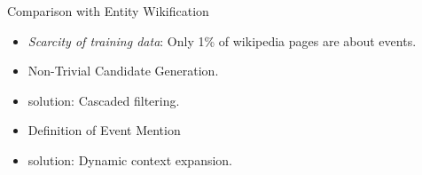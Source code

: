 \begin{frame}{Comparison with Entity Wikification}

  \begin{itemize}[<+->]
  \item \emph{Scarcity of training data}: Only 1\% of wikipedia pages are about events.
  \item Non-Trivial Candidate Generation.
  \item {\color{red}solution:} Cascaded filtering.
  \item Definition of Event Mention
  \item {\color{red}solution:} Dynamic context expansion.
  \end{itemize}
\end{frame}






